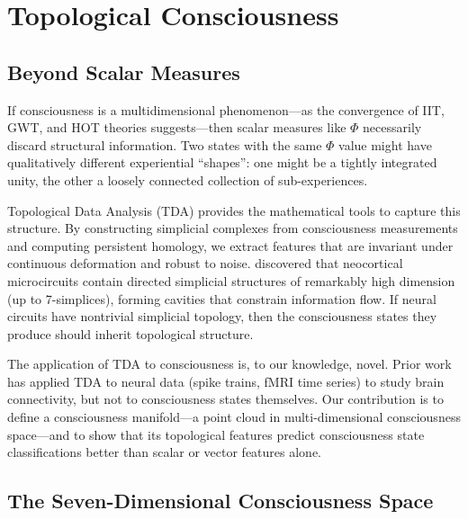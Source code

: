\documentclass[12pt]{book}
\begin{document}


\chapter{Topological Consciousness}
\label{ch:topology}

\section{Beyond Scalar Measures}

If consciousness is a multidimensional phenomenon---as the convergence of IIT, GWT, and HOT theories suggests---then scalar measures like $\Phi$ necessarily discard structural information. Two states with the same $\Phi$ value might have qualitatively different experiential ``shapes'': one might be a tightly integrated unity, the other a loosely connected collection of sub-experiences.

Topological Data Analysis (TDA) provides the mathematical tools to capture this structure. By constructing simplicial complexes from consciousness measurements and computing persistent homology, we extract features that are invariant under continuous deformation and robust to noise. \citet{reimann2017cliques} discovered that neocortical microcircuits contain directed simplicial structures of remarkably high dimension (up to 7-simplices), forming cavities that constrain information flow. If neural circuits have nontrivial simplicial topology, then the consciousness states they produce should inherit topological structure.

The application of TDA to consciousness is, to our knowledge, novel. Prior work has applied TDA to neural data (spike trains, fMRI time series) to study brain connectivity, but not to consciousness states themselves. Our contribution is to define a consciousness manifold---a point cloud in multi-dimensional consciousness space---and to show that its topological features predict consciousness state classifications better than scalar or vector features alone.

\section{The Seven-Dimensional Consciousness Space}
\end{document}
